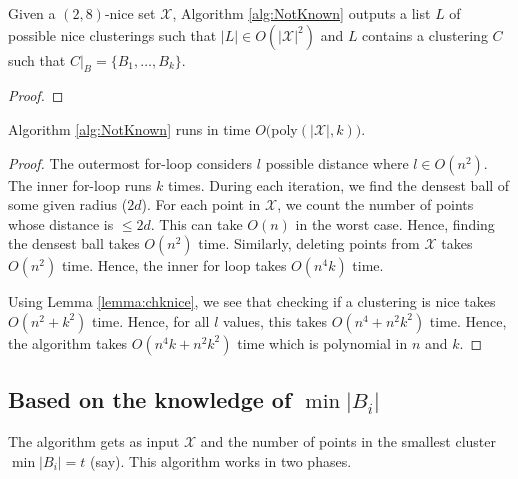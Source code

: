 \documentclass[11pt]{article}
\begin{document}
\begin{theorem}
Given a $(2,8)$-nice set $\mathcal{X}$, Algorithm \ref{alg:NotKnown} outputs a list $L$ of possible nice clusterings such that $|L| \in O(|\mathcal{X}|^2)$ and $L$ contains a clustering $C$ such that $C|_B = \{B_1,\ldots,B_k\}$.
\end{theorem}
\begin{proof}
\end{proof}

\begin{theorem}
Algorithm \ref{alg:NotKnown} runs in time $O($poly$(|\mathcal{X}|,k))$.
\end{theorem}
\begin{proof}
The outermost for-loop considers $l$ possible distance where $l \in O(n^2)$. The inner for-loop runs $k$ times. During each iteration, we find the densest ball of some given radius ($2d$). For each point in $\mathcal{X}$, we count the number of points whose distance is $\le 2d$. This can take $O(n)$ in the worst case. Hence, finding the densest ball takes $O(n^2)$ time. Similarly, deleting points from $\mathcal{X}$ takes $O(n^2)$ time. Hence, the inner for loop takes $O(n^4k)$ time.

Using Lemma \ref{lemma:chknice}, we see that checking if a clustering is nice takes $O(n^2+k^2)$ time. Hence, for all $l$ values, this takes $O(n^4+n^2k^2)$ time. Hence, the algorithm takes $O(n^4k+n^2k^2)$ time which is polynomial in $n$ and $k$.
\end{proof}

\subsection{Based on the knowledge of $\min |B_i|$}
The algorithm gets as input $\mathcal{X}$ and the number of points in the smallest cluster $\min |B_i| = t$ (say). This algorithm works in two phases.
\end{document}
